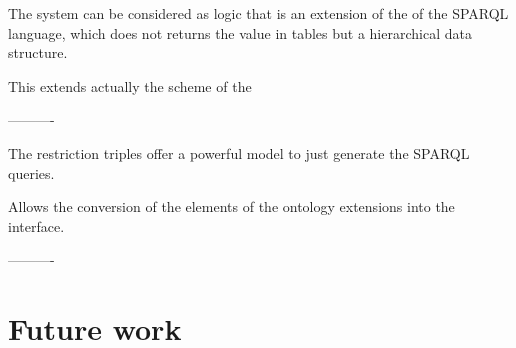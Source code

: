 The system can be considered as logic that is an extension of the of the SPARQL language, which does not returns the value in tables but a hierarchical data structure. 


This extends actually the scheme of the 

----------

The restriction triples offer a powerful model to just generate the SPARQL queries.




Allows the conversion of the elements of the ontology extensions into the interface. 


----------






\section{Future work}




